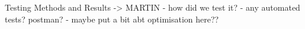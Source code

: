 Testing Methods and Results -> MARTIN
  - how did we test it?
  - any automated tests? postman?
  - maybe put a bit abt optimisation here??
